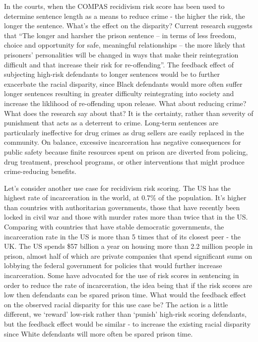 In the courts, when the COMPAS recidivism risk score has been used to determine sentence length as a means to reduce crime - the higher the risk, the longer the sentence. What's the effect on the disparity? Current research suggests that ``The longer and harsher the prison sentence – in terms of less freedom, choice and opportunity for safe, meaningful relationships – the more likely that prisoners’ personalities will be changed in ways that make their reintegration difficult and that increase their risk for re-offending''\cite{BBCFPrison}. The feedback effect of subjecting high-risk defendants to longer sentences would be to further exacerbate the racial disparity, since Black defendants would more often suffer longer sentences resulting in greater difficulty reintegrating into society and increase the liklihood of re-offending upon release. What about reducing crime? What does the research say about that? It is the certainty, rather than severity of punishment that acts as a deterrent to crime\cite{Nagin}. Long-term sentences are particularly ineffective for drug crimes as drug sellers are easily replaced in the community\cite{TheSentProj}. On balance, excessive incarceration has negative consequences for public safety because finite resources spent on prison are diverted from policing, drug treatment, preschool programs, or other interventions that might produce crime-reducing benefits.

Let's consider another use case for recidivism risk scoring. The US has the highest rate of incarceration in the world, at 0.7\% of the population\cite{PrisPolInit}. It's higher than countries with authoritarian governments, those that have recently been locked in civil war and those with murder rates more than twice that in the US. Comparing with countries that have stable democratic governments, the incarceration rate in the US is more than 5 times that of its closest peer - the UK. The US spends \$57 billion a year on housing more than 2.2 million people in prison\cite{BBCFLongSent}, almost half of which are private companies that spend significant sums on lobbying the federal government for policies that would further increase incarceration. Some have advocated for the use of risk scores in sentencing in order to reduce the rate of incarceration, the idea being that if the risk scores are low then defendants can be spared prison time. What would the feedback effect on the observed racial disparity for this use case be? The action is a little different, we `reward' low-risk rather than `punish' high-risk scoring defendants, but the feedback effect would be similar - to increase the existing racial disparity since White defendants will more often be spared prison time.

